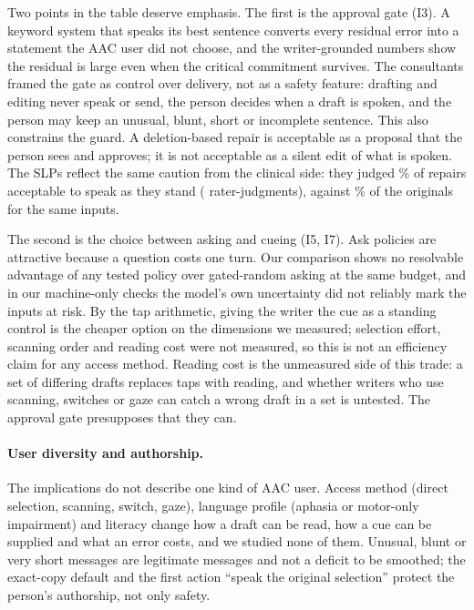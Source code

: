 Two points in the table deserve emphasis.
The first is the approval gate (I3).
A keyword system that speaks its best sentence converts every residual error into a statement the AAC user did not choose, and the writer-grounded numbers show the residual is large even when the critical commitment survives.
The consultants framed the gate as control over delivery, not as a safety feature: drafting and editing never speak or send, the person decides when a draft is spoken, and the person may keep an unusual, blunt, short or incomplete sentence.
This also constrains the guard.
A deletion-based repair is acceptable as a proposal that the person sees and approves; it is not acceptable as a silent edit of what is spoken.
The SLPs reflect the same caution from the clinical side: they judged \jmslpAccRepair{}\% of repairs acceptable to speak as they stand (\jmslpAccRepairN{} rater-judgments), against \jmslpAccOrig{}\% of the originals for the same inputs.

The second is the choice between asking and cueing (I5, I7).
Ask policies are attractive because a question costs one turn.
Our comparison shows no resolvable advantage of any tested policy over gated-random asking at the same budget, and in our machine-only checks the model's own uncertainty did not reliably mark the inputs at risk.
By the tap arithmetic, giving the writer the cue as a standing control is the cheaper option on the dimensions we measured; selection effort, scanning order and reading cost were not measured, so this is not an efficiency claim for any access method.
Reading cost is the unmeasured side of this trade: a set of differing drafts replaces taps with reading, and whether writers who use scanning, switches or gaze can catch a wrong draft in a set is untested.
The approval gate presupposes that they can.

\paragraph{User diversity and authorship.}
The implications do not describe one kind of AAC user. Access method (direct selection, scanning, switch, gaze), language profile (aphasia or motor-only impairment) and literacy change how a draft can be read, how a cue can be supplied and what an error costs, and we studied none of them. Unusual, blunt or very short messages are legitimate messages and not a deficit to be smoothed; the exact-copy default and the first action ``speak the original selection'' protect the person's authorship, not only safety.

